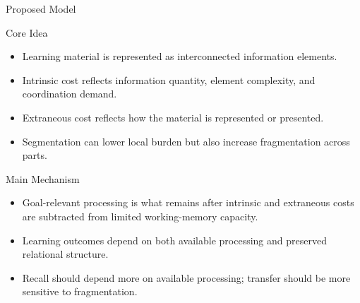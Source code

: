 \documentclass{beamer}
\begin{document}
\begin{frame}[t]{Proposed Model}

\begin{block}{Core Idea}
\begin{itemize}
\setlength{\itemsep}{0.15em}
\item Learning material is represented as interconnected information elements.
\item Intrinsic cost reflects information quantity, element complexity, and coordination demand.
\item Extraneous cost reflects how the material is represented or presented.
\item Segmentation can lower local burden but also increase fragmentation across parts.
\end{itemize}
\end{block}

\begin{alertblock}{Main Mechanism}
\begin{itemize}
\setlength{\itemsep}{0.15em}
\item Goal-relevant processing is what remains after intrinsic and extraneous costs are subtracted from limited working-memory capacity.
\item Learning outcomes depend on both available processing and preserved relational structure.
\item Recall should depend more on available processing; transfer should be more sensitive to fragmentation.
\end{itemize}
\end{alertblock}

\end{frame}
\end{document}
